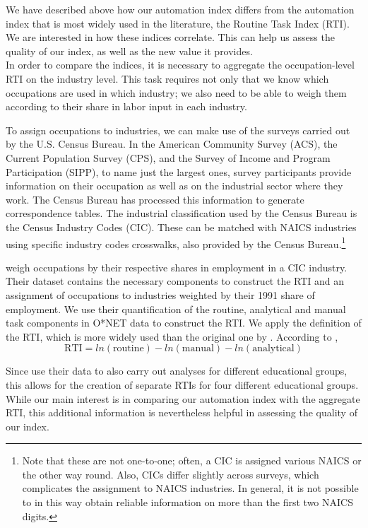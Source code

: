 \documentclass[11pt,a4paper,fleqn]{article}
\begin{document}
We have described above how our automation index differs from the automation index that is most widely used in the literature, the Routine Task Index (RTI). We are interested in how these indices correlate. This can help us assess the quality of our index, as well as the new value it provides.\\
In order to compare the indices, it is necessary to aggregate the occupation-level RTI on the industry level. This task requires not only that we know which occupations are used in which industry; we also need to be able to weigh them according to their share in labor input in each industry.

To assign occupations to industries, we can make use of the surveys carried out by the U.S. Census Bureau. In the American Community Survey (ACS), the Current Population Survey (CPS), and the Survey of Income and Program Participation (SIPP), to name just the largest ones, survey participants provide information on their occupation as well as on the industrial sector where they work. The Census Bureau has processed this information to generate correspondence tables. The industrial classification used by the Census Bureau is the Census Industry Codes (CIC). These can be matched with NAICS industries using specific industry codes crosswalks, also provided by the Census Bureau.\footnote{Note that these are not one-to-one; often, a CIC is assigned various NAICS or the other way round. Also, CICs differ slightly across surveys, which complicates the assignment to NAICS industries. In general, it is not possible to in this way obtain reliable information on more than the first two NAICS digits.}

\cite{ALM2003} weigh occupations by their respective shares in employment in a CIC industry. Their dataset contains the necessary components to construct the RTI and an assignment of occupations to industries weighted by their 1991 share of employment. We use their quantification of the routine, analytical and manual task components in O*NET data to construct the RTI. We apply the \cite{AD2013} definition of the RTI, which is more widely used than the original one by \cite{ALM2003}. According to \cite{AD2013},
\begin{equation}
 \text{RTI} = ln(\text{routine}) - ln(\text{manual}) - ln(\text{analytical})
\end{equation}  

Since \cite{ALM2003} use their data to also carry out analyses for different educational groups, this allows for the creation of separate RTIs for four different educational groups. While our main interest is in comparing our automation index with the aggregate RTI, this additional information is nevertheless helpful in assessing the quality of our index. 
\end{document}
